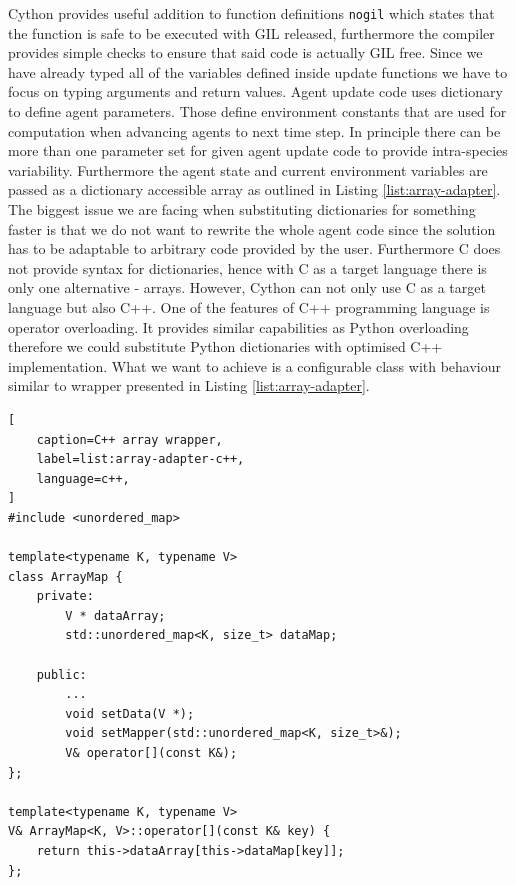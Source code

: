 \documentclass[12pt, a4paper]{report}
\begin{document}
Cython provides useful addition to function definitions \lstinline{nogil} which
states that the function is safe to be executed with GIL released, furthermore
the compiler provides simple checks to ensure that said code is actually GIL free. Since
we have already typed all of the variables defined inside update functions we
have to focus on typing arguments and return values. Agent update code uses
dictionary to define agent parameters. Those define environment constants that
are used for computation when advancing agents to next time step. In principle
there can be more than one parameter set for given agent update code to provide
intra-species variability. Furthermore the agent state and current environment
variables are passed as a dictionary accessible array as outlined in Listing
\ref{list:array-adapter}. The biggest issue we are facing when substituting
dictionaries for something faster is that we do not want to rewrite the whole
agent code since the solution has to be adaptable to arbitrary code provided
by the user. Furthermore C does not provide syntax for dictionaries, hence
with C as a target language there is only one alternative - arrays. However,
Cython can not only use C as a target language but also C++. One of the
features of C++ programming language is operator overloading. It provides
similar capabilities as Python overloading therefore we could substitute Python
dictionaries with optimised C++ implementation. What we want to achieve is a
configurable class with behaviour similar to wrapper presented in Listing
\ref{list:array-adapter}.

\begin{lstlisting}[
    caption=C++ array wrapper,
    label=list:array-adapter-c++,
    language=c++,
]
#include <unordered_map>

template<typename K, typename V>
class ArrayMap {
    private:
        V * dataArray;
        std::unordered_map<K, size_t> dataMap;

    public:
        ...
        void setData(V *);
        void setMapper(std::unordered_map<K, size_t>&);
        V& operator[](const K&);
};

template<typename K, typename V>
V& ArrayMap<K, V>::operator[](const K& key) {
    return this->dataArray[this->dataMap[key]];
};
\end{lstlisting}
\end{document}
